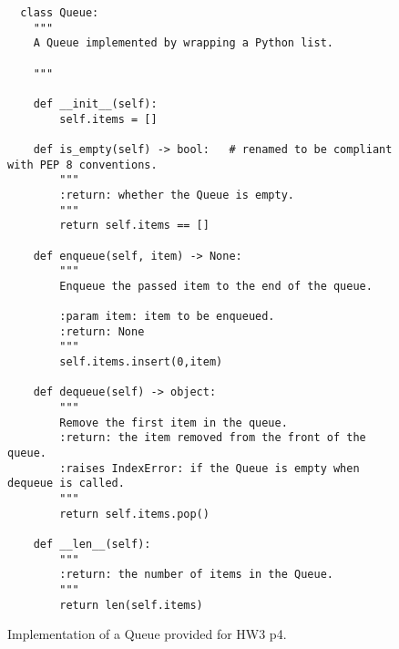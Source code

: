 \documentclass{article}
\begin{document}
\begin{figure}
\begin{verbatim}
  class Queue:
    """
    A Queue implemented by wrapping a Python list.

    """

    def __init__(self):
        self.items = []

    def is_empty(self) -> bool:   # renamed to be compliant with PEP 8 conventions.
        """
        :return: whether the Queue is empty.
        """
        return self.items == []

    def enqueue(self, item) -> None:
        """
        Enqueue the passed item to the end of the queue.

        :param item: item to be enqueued.
        :return: None
        """
        self.items.insert(0,item)

    def dequeue(self) -> object:
        """
        Remove the first item in the queue.
        :return: the item removed from the front of the queue.
        :raises IndexError: if the Queue is empty when dequeue is called.
        """
        return self.items.pop()

    def __len__(self):
        """
        :return: the number of items in the Queue.
        """
        return len(self.items)

\end{verbatim}
\caption{Implementation of a Queue provided for HW3 p4.}\label{fig:queue}

\end{figure}
\end{document}
